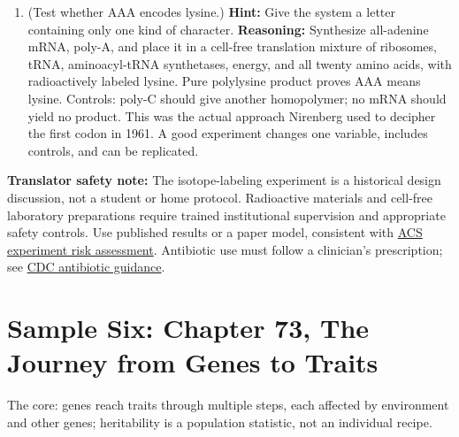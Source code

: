 \begin{enumerate}[itemsep=3pt]
\item (Test whether AAA encodes lysine.) \textbf{Hint:} Give the system a letter containing only one kind of character. \textbf{Reasoning:} Synthesize all-adenine mRNA, poly-A, and place it in a cell-free translation mixture of ribosomes, tRNA, aminoacyl-tRNA synthetases, energy, and all twenty amino acids, with radioactively labeled lysine. Pure polylysine product proves AAA means lysine. Controls: poly-C should give another homopolymer; no mRNA should yield no product. This was the actual approach Nirenberg used to decipher the first codon in 1961. A good experiment changes one variable, includes controls, and can be replicated.
\end{enumerate}

\textbf{Translator safety note:} The isotope-labeling experiment is a historical design discussion, not a student or home protocol. Radioactive materials and cell-free laboratory preparations require trained institutional supervision and appropriate safety controls. Use published results or a paper model, consistent with \href{https://institute.acs.org/acs-center/lab-safety/education-training/safer-experiments.html}{ACS experiment risk assessment}. Antibiotic use must follow a clinician's prescription; see \href{https://www.cdc.gov/antibiotic-use/about/}{CDC antibiotic guidance}.

\section{Sample Six: Chapter 73, The Journey from Genes to Traits}

The core: genes reach traits through multiple steps, each affected by environment and other genes; heritability is a population statistic, not an individual recipe.


